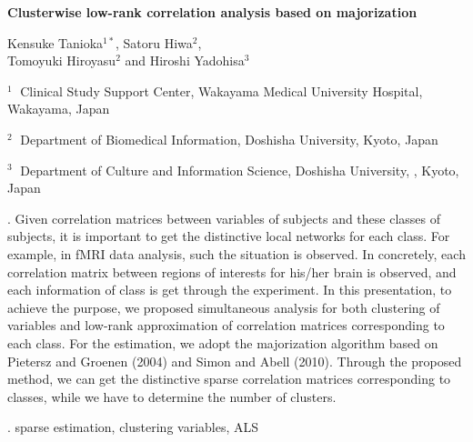 \documentclass[12pt]{article}
\begin{document}
\begin{flushleft}


{\LARGE\bf Clusterwise low-rank correlation  analysis based on majorization}


\vspace{1.0cm}

Kensuke Tanioka$^{1*}$, Satoru Hiwa$^2$,  \\ Tomoyuki Hiroyasu$^2$  and Hiroshi Yadohisa$^3$

\begin{description}

\item $^1 \;$ Clinical Study Support Center, Wakayama Medical University Hospital,
Wakayama, Japan

\item $^2 \;$ Department of Biomedical Information, Doshisha University, Kyoto, Japan

\item $^3 \;$ Department of Culture and Information Science, Doshisha University,
, Kyoto, Japan

\end{description}

\end{flushleft}


\vspace{0.75cm}

. 
Given correlation matrices between variables of subjects and these classes of subjects,
it is important to get the distinctive local networks for each class.  
For example, in fMRI data analysis, such the situation is observed. 
In concretely, each correlation matrix between
regions of interests for his/her brain is observed, and 
each information of class is get through the experiment.
In this presentation, to achieve the purpose, we proposed simultaneous analysis
for both clustering of variables and low-rank approximation of correlation matrices corresponding to
each class. 
For the estimation, we adopt the majorization algorithm based on 
Pietersz and Groenen (2004) and Simon and Abell (2010).
Through the proposed method, we can get the distinctive sparse correlation matrices
corresponding to classes, while we have to determine the number of clusters.   


\vskip 2mm

. sparse estimation, clustering variables, ALS
\end{document}
